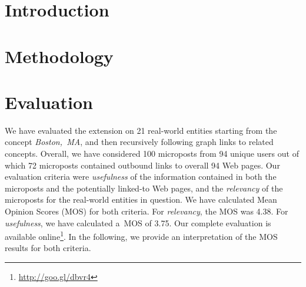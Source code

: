 \documentclass[runningheads,a4paper]{llncs}
\begin{document}
\section{Introduction}

\section{Methodology}

\section{Evaluation}
We have evaluated the extension on 21 real-world entities starting from the concept
\emph{Boston,~MA}, and then recursively following graph links to related concepts.
Overall, we have considered 100 microposts from 94 unique users
out of which 72 microposts contained outbound links to overall 94 Web pages.
Our evaluation criteria were \emph{usefulness} of the information
contained in both the microposts and the potentially linked-to Web pages,
and the \emph{relevancy} of the microposts for the real-world entities in question.
We have calculated Mean Opinion Scores (MOS) for both criteria.
For \emph{relevancy}, the MOS was 4.38.
For \emph{usefulness}, we have calculated a~MOS of 3.75.
Our complete evaluation is available online\footnote{\url{http://goo.gl/dbvr4}}.
In the following, we provide an interpretation of the MOS results for both criteria.
\end{document}
